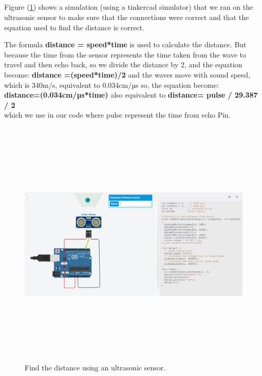 \documentclass[12pt,a4paper]{report}
\begin{document}
\subsection{\fontsize{12}{12}\selectfont{Test Ultrasonic sensor using the  tinkercad simulator.}}
Figure (\ref{fig:Distance}) shows a simulation (using a tinkercad simulator) that we ran on the ultrasonic sensor to make sure that the connections were correct and that the equation used to find the distance is correct.

The formula \textbf{distance = speed*time} is used to calculate the distance. But because the time from the sensor represents the time taken from the wave to travel and then echo back, so we divide the distance by 2, and the equation become:
\textbf{distance =(speed*time)/2} 
and the waves move with sound speed, which is 340m/s, equivalent to 0.034cm/µs 
so, the equation become:\\
\textbf{distance=(0.034cm/µs*time) }also equivalent to \textbf{distance= pulse / 29.387 / 2}\\
which we use in our code where pulse represent the time from echo Pin.


\begin{figure}[H]
    \centering
    \graphicspath{ {./images/} }
    \includegraphics [width=16cm,height=12cm]{Ultra.PNG}
    \caption{Find the distance using an ultrasonic sensor.}
    \label{fig:Distance}
\end{figure}
\end{document}
